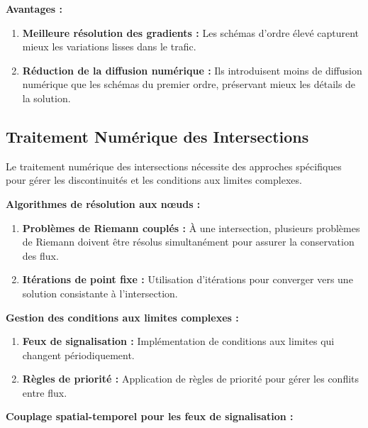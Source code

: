 \textbf{Avantages :}

\begin{enumerate}
    \item \textbf{Meilleure résolution des gradients :} Les schémas d'ordre élevé capturent mieux les variations lisses dans le trafic.
    \item \textbf{Réduction de la diffusion numérique :} Ils introduisent moins de diffusion numérique que les schémas du premier ordre, préservant mieux les détails de la solution.
\end{enumerate}


\subsection{Traitement Numérique des Intersections}
Le traitement numérique des intersections nécessite des approches spécifiques pour gérer les discontinuités et les conditions aux limites complexes.

\textbf{Algorithmes de résolution aux nœuds :}

\begin{enumerate}
    \item \textbf{Problèmes de Riemann couplés :} À une intersection, plusieurs problèmes de Riemann doivent être résolus simultanément pour assurer la conservation des flux.
    \item \textbf{Itérations de point fixe :} Utilisation d'itérations pour converger vers une solution consistante à l'intersection.
\end{enumerate}

\textbf{Gestion des conditions aux limites complexes :}

\begin{enumerate}
    \item \textbf{Feux de signalisation :} Implémentation de conditions aux limites qui changent périodiquement.
    \item \textbf{Règles de priorité :} Application de règles de priorité pour gérer les conflits entre flux.
\end{enumerate}

\textbf{Couplage spatial-temporel pour les feux de signalisation :}

